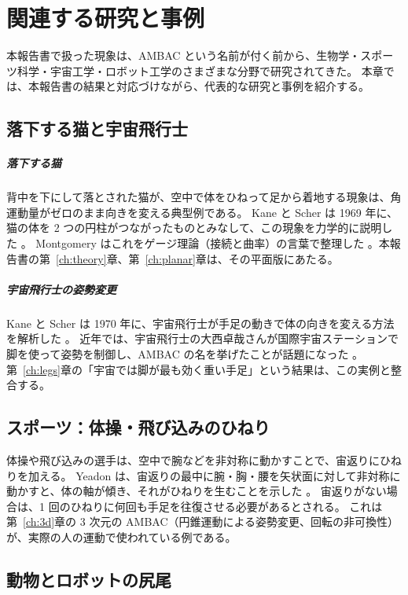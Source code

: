 \chapter{関連する研究と事例}\label{ch:related}

本報告書で扱った現象は、AMBAC という名前が付く前から、生物学・スポーツ科学・宇宙工学・ロボット工学のさまざまな分野で研究されてきた。
本章では、本報告書の結果と対応づけながら、代表的な研究と事例を紹介する。

\section{落下する猫と宇宙飛行士}

\paragraph{落下する猫}
背中を下にして落とされた猫が、空中で体をひねって足から着地する現象は、角運動量がゼロのまま向きを変える典型例である。
Kane と Scher は 1969 年に、猫の体を 2 つの円柱がつながったものとみなして、この現象を力学的に説明した \cite{R7}。
Montgomery はこれをゲージ理論（接続と曲率）の言葉で整理した \cite{R4}。本報告書の第~\ref{ch:theory}章、第~\ref{ch:planar}章は、その平面版にあたる。

\paragraph{宇宙飛行士の姿勢変更}
Kane と Scher は 1970 年に、宇宙飛行士が手足の動きで体の向きを変える方法を解析した \cite{R8}。
近年では、宇宙飛行士の大西卓哉さんが国際宇宙ステーションで脚を使って姿勢を制御し、AMBAC の名を挙げたことが話題になった \cite{R43,R44}。
第~\ref{ch:legs}章の「宇宙では脚が最も効く重い手足」という結果は、この実例と整合する。

\section{スポーツ：体操・飛び込みのひねり}

体操や飛び込みの選手は、空中で腕などを非対称に動かすことで、宙返りにひねりを加える。
Yeadon は、宙返りの最中に腕・胸・腰を矢状面に対して非対称に動かすと、体の軸が傾き、それがひねりを生むことを示した \cite{R46}。
宙返りがない場合は、1 回のひねりに何回も手足を往復させる必要があるとされる。
これは第~\ref{ch:3d}章の 3 次元の AMBAC（円錐運動による姿勢変更、回転の非可換性）が、実際の人の運動で使われている例である。

\section{動物とロボットの尻尾}

